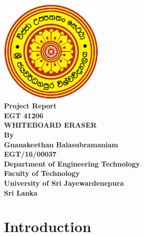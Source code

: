 \documentclass[12pt,a4paper,oneside]{article}
\begin{document}
\begin{titlepage}

\begin{flushright}
\end{flushright}


\center %
{
\includegraphics[width=2in,keepaspectratio]{logo.png}\\[0.5cm]
\fontsize{16pt}{24}\selectfont \textbf{Project Report}\\[0.5cm]
\fontsize{16pt}{24}\selectfont \textbf{EGT 41206}\\[0.75cm]
\fontsize{24pt}{30}\selectfont \textbf{\uppercase{Whiteboard Eraser}}\\[1.5cm]
\fontsize{16pt}{24}\selectfont \textbf{By}\\[0.5cm]
\fontsize{12pt}{12}\selectfont {
}
\vspace{5cm}
\fontsize{12pt}{12}\selectfont \textbf { Gnanakeethan Balasubramaniam \\ EGT/16/00037}\\[0.5cm]


\vspace*{\fill}
\fontsize{12pt}{12}\selectfont \textbf {Department of Engineering Technology \\ Faculty of Technology\\University of Sri Jayewardenepura\\ Sri Lanka}\\[0.5cm]
}

\vfill %

\end{titlepage}



\newpage
\tableofcontents

\listoffigures
\newpage
{}
\setcounter{page}{1}


\section{Introduction}
\end{document}
